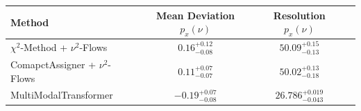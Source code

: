     \begin{tabular}{lccc}
        \toprule
        Method & Mean Deviation $p_{x}(\nu)$ & Resolution $p_{x}(\nu)$ \\
        \midrule
        $\chi^2$-Method + $\nu^2$-Flows & $0.16^{+0.12}_{-0.08}$ & $50.09^{+0.15}_{-0.13}$ \\
        ComapctAssigner + $\nu^2$-Flows & $0.11^{+0.07}_{-0.07}$ & $50.02^{+0.13}_{-0.18}$ \\
        MultiModalTransformer & $-0.19^{+0.07}_{-0.08}$ & $26.786^{+0.019}_{-0.043}$ \\
        \bottomrule
    \end{tabular}